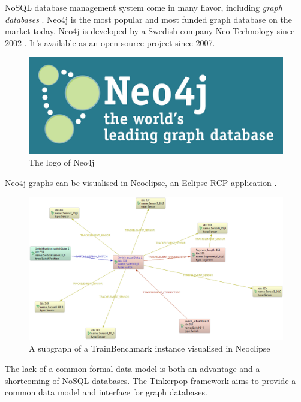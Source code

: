 NoSQL database management system come in many flavor, including \textit{graph databases} \cite{NoSQL}. Neo4j is the most popular and most funded graph database on the market today. Neo4j is developed by a Swedish company Neo Technology since 2002 \cite{neo4j}. It's available as an open source project since 2007.

\begin{figure}
\begin{center}
\includegraphics[]{figures/neo4j-logo}
\caption{The logo of Neo4j}
\label{fig:neo4j-logo}
\end{center}
\end{figure}

Neo4j graphs can be visualised in Neoclipse, an Eclipse RCP application \cite{Neoclipse}.

\begin{figure}
\begin{center}
\includegraphics[width=14cm]{figures/neoclipse-graph}
\caption{A subgraph of a TrainBenchmark instance visualised in Neoclipse}
\label{fig:neoclipse}
\end{center}
\end{figure}

The lack of a common formal data model is both an advantage and a shortcoming of NoSQL databases. The Tinkerpop framework \cite{Tinkerpop} aims to provide a common data model and interface for graph databases.

